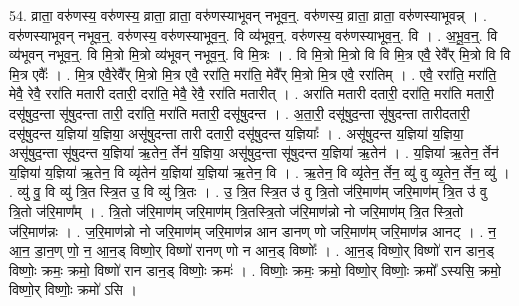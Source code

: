 \documentclass[17pt]{extarticle}
\begin{document}
54. व्राता॒ वरु॑णस्य॒ वरु॑णस्य॒ व्राता॒ व्राता॒ वरु॑णस्याभूवन् नभूव॒न्॒. वरु॑णस्य॒ व्राता॒ व्राता॒ वरु॑णस्याभूवन्न् । . वरु॑णस्याभूवन् नभूव॒न्॒. वरु॑णस्य॒ वरु॑णस्याभूव॒न्॒. वि व्य॑भूव॒न्॒. वरु॑णस्य॒ वरु॑णस्याभूव॒न्॒. वि । . अ॒भू॒व॒न्॒. वि व्य॑भूवन् नभूव॒न्॒. वि मि॒त्रो मि॒त्रो व्य॑भूवन् नभूव॒न्॒. वि मि॒त्रः । . वि मि॒त्रो मि॒त्रो वि वि मि॒त्र एवै॒ रेवै᳚र् मि॒त्रो वि वि मि॒त्र एवैः᳚ । . मि॒त्र एवै॒रेवै᳚र् मि॒त्रो मि॒त्र एवै॒ ररा॑ति॒ मरा॑ति॒ मेवै᳚र् मि॒त्रो मि॒त्र एवै॒ ररा॑तिम् । . एवै॒ ररा॑ति॒ मरा॑ति॒ मेवै॒ रेवै॒ ररा॑ति मतारी दतारी॒ दरा॑ति॒ मेवै॒ रेवै॒ ररा॑ति मतारीत् । . अरा॑ति मतारी दतारी॒ दरा॑ति॒ मरा॑ति मतारी॒ दसू॑षुद॒न्ता सू॑षुदन्ता तारी॒ दरा॑ति॒ मरा॑ति मतारी॒ दसू॑षुदन्त । . अ॒ता॒री॒ दसू॑षुद॒न्ता सू॑षुदन्ता तारीदतारी॒ दसू॑षुदन्त य॒ज्ञिया॑ य॒ज्ञिया॒ असू॑षुदन्ता तारी दतारी॒ दसू॑षुदन्त य॒ज्ञियाः᳚ । . असू॑षुदन्त य॒ज्ञिया॑ य॒ज्ञिया॒ असू॑षुद॒न्ता सू॑षुदन्त य॒ज्ञिया॑ ऋ॒तेन॒ र्तेन॑ य॒ज्ञिया॒ असू॑षुद॒न्ता सू॑षुदन्त य॒ज्ञिया॑ ऋ॒तेन॑ । . य॒ज्ञिया॑ ऋ॒तेन॒ र्तेन॑ य॒ज्ञिया॑ य॒ज्ञिया॑ ऋ॒तेन॒ वि व्यृ॑तेन॑ य॒ज्ञिया॑ य॒ज्ञिया॑ ऋ॒तेन॒ वि । . ऋ॒तेन॒ वि व्यृ॑तेन॒ र्तेन॒ व्यु॑ वु व्यृ॒तेन॒ र्तेन॒ व्यु॑ । . व्यु॑ वु॒ वि व्यु॑ त्रि॒त स्त्रि॒त उ॒ वि व्यु॑ त्रि॒तः । . उ॒ त्रि॒त स्त्रि॒त उ॑ वु त्रि॒तो ज॑रि॒माण॑म् जरि॒माण॑म् त्रि॒त उ॑ वु त्रि॒तो ज॑रि॒माण᳚म् । . त्रि॒तो ज॑रि॒माण॑म् जरि॒माण॑म् त्रि॒तस्त्रि॒तो ज॑रि॒माण॑न्नो नो जरि॒माण॑म् त्रि॒त स्त्रि॒तो ज॑रि॒माण॑न्नः । . ज॒रि॒माण॑न्नो नो जरि॒माण॑म् जरि॒माण॑न्न आन डानण् णो जरि॒माण॑म् जरि॒माण॑न्न आनट् । . न॒ आ॒न॒ डा॒न॒ण् णो॒ न॒ आ॒न॒ड् विष्णो॒र् विष्णो॑ रानण् णो न आन॒ड् विष्णोः᳚ । . आ॒न॒ड् विष्णो॒र् विष्णो॑ रान डान॒ड् विष्णोः॒ क्रमः॒ क्रमो॒ विष्णो॑ रान डान॒ड् विष्णोः॒ क्रमः॑ । . विष्णोः॒ क्रमः॒ क्रमो॒ विष्णो॒र् विष्णोः॒ क्रमो᳚ ऽस्यसि॒ क्रमो॒ विष्णो॒र् विष्णोः॒ क्रमो॑ ऽसि । \newline
\end{document}
